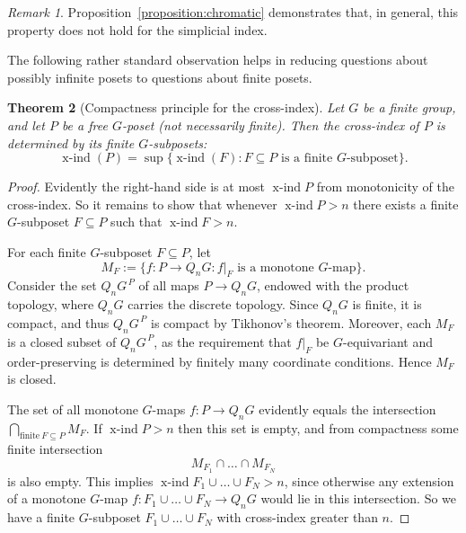 \documentclass[preprint,12pt]{article}
\newtheorem{theorem}{Theorem}[section]
\theoremstyle{definition}
\theoremstyle{remark}
\newtheorem{remark}[theorem]{Remark}
\numberwithin{equation}{section}
\DeclareMathOperator{\xind}{x-ind}
\begin{document}
\begin{remark}
Proposition~\ref{proposition:chromatic} demonstrates that, in general, this property does not hold for the simplicial index.
\end{remark}

The following rather standard observation helps in reducing questions about possibly infinite posets to questions about finite posets.

\begin{theorem}[Compactness principle for the cross-index]
Let $G$ be a finite group, and let $P$ be a free $G$-poset (not necessarily finite). Then the cross-index of $P$ is determined by its finite $G$-subposets:
\[
\xind(P)=\sup\{\xind(F): F\subseteq P \text{ is a finite $G$-subposet}\}.
\]
\end{theorem}
\begin{proof}
Evidently the right-hand side is at most $\xind P$ from monotonicity of the cross-index. So it remains to show that whenever $\xind P>n$ there exists a finite $G$-subposet $F\subseteq P$ such that $\xind F> n$.


For each finite \(G\)-subposet \(F\subseteq P\), let
\[
M_F:=\{f:P\to Q_nG : f|_F \text{ is a monotone \(G\)-map}\}.
\]
Consider the set \({Q_nG}^{\,P}\) of all maps \(P\to Q_nG\), endowed with the product topology, where \(Q_nG\) carries the discrete topology. Since \(Q_nG\) is finite, it is compact, and thus \(Q_nG^{\,P}\) is compact by Tikhonov's theorem. Moreover, each \(M_F\) is a closed subset of \(Q_nG^{\,P}\), as the requirement that \(f|_F\) be \(G\)-equivariant and order-preserving is determined by finitely many coordinate conditions. Hence \(M_F\) is closed.

The set of all monotone $G$-maps $f: P\to Q_nG$ evidently equals the intersection $\bigcap_{\text{finite}\ F\subseteq P} M_F$. If $\xind P>n$ then this set is empty, and from compactness some finite intersection
\[
M_{F_1}\cap \dots \cap M_{F_N}
\]
is also empty. This implies $\xind F_1\cup\dots\cup F_N > n$, since otherwise any extension of a monotone $G$-map $f : F_1\cup\dots\cup F_N\to Q_nG$ would lie in this intersection. So we have a finite $G$-subposet $F_1\cup\dots\cup F_N$ with cross-index greater than $n$.
\end{proof}
\end{document}
